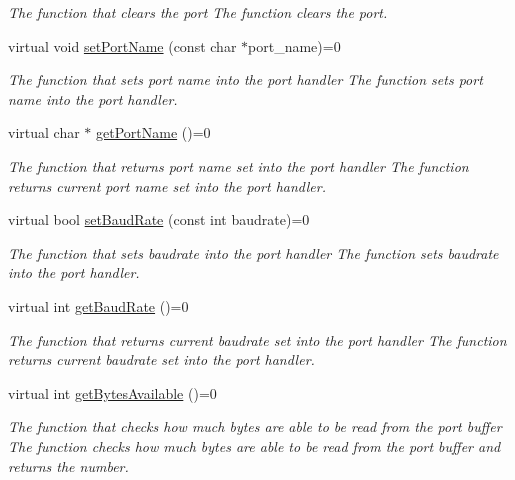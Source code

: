 \begin{DoxyCompactItemize}
\begin{DoxyCompactList}\small\item\em The function that clears the port  The function clears the port. \end{DoxyCompactList}\item 
virtual void \hyperlink{classmercury_1_1_port_handler_adb0bff39482904066c1bdd7713441e9e}{set\+Port\+Name} (const char $\ast$port\+\_\+name)=0
\begin{DoxyCompactList}\small\item\em The function that sets port name into the port handler  The function sets port name into the port handler. \end{DoxyCompactList}\item 
virtual char $\ast$ \hyperlink{classmercury_1_1_port_handler_ab6e0df491f6a6b4f927401e60c0c9c5c}{get\+Port\+Name} ()=0
\begin{DoxyCompactList}\small\item\em The function that returns port name set into the port handler  The function returns current port name set into the port handler. \end{DoxyCompactList}\item 
virtual bool \hyperlink{classmercury_1_1_port_handler_a663168c32580a532ccb328544565f06d}{set\+Baud\+Rate} (const int baudrate)=0
\begin{DoxyCompactList}\small\item\em The function that sets baudrate into the port handler  The function sets baudrate into the port handler. \end{DoxyCompactList}\item 
virtual int \hyperlink{classmercury_1_1_port_handler_a686c731714c095ac194847cd585643ea}{get\+Baud\+Rate} ()=0
\begin{DoxyCompactList}\small\item\em The function that returns current baudrate set into the port handler  The function returns current baudrate set into the port handler. \end{DoxyCompactList}\item 
virtual int \hyperlink{classmercury_1_1_port_handler_a2c0a25741b4b8d15e19e619ed7b5a148}{get\+Bytes\+Available} ()=0
\begin{DoxyCompactList}\small\item\em The function that checks how much bytes are able to be read from the port buffer  The function checks how much bytes are able to be read from the port buffer  and returns the number. \end{DoxyCompactList}\item 

\end{DoxyCompactItemize}
